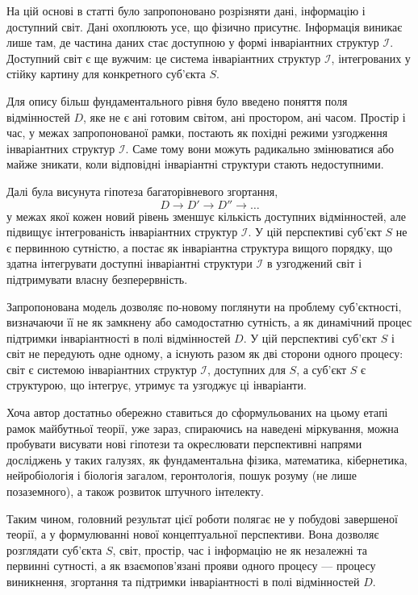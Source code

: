 \documentclass[aps,prd,onecolumn,nofootinbib,superscriptaddress]{revtex4-2}
\begin{document}
На цій основі в статті було запропоновано розрізняти дані, інформацію і доступний світ. Дані охоплюють усе, що фізично присутнє. Інформація виникає лише там, де частина даних стає доступною у формі інваріантних структур \(\mathcal{I}\). Доступний світ є ще вужчим: це система інваріантних структур \(\mathcal{I}\), інтегрованих у стійку картину для конкретного суб’єкта \(S\).

Для опису більш фундаментального рівня було введено поняття поля відмінностей \(D\), яке не є ані готовим світом, ані простором, ані часом. Простір і час, у межах запропонованої рамки, постають як похідні режими узгодження інваріантних структур \(\mathcal{I}\). Саме тому вони можуть радикально змінюватися або майже зникати, коли відповідні інваріантні структури стають недоступними.

Далі була висунута гіпотеза багаторівневого згортання,
\[
D \to D' \to D'' \to \dots
\]
у межах якої кожен новий рівень зменшує кількість доступних відмінностей, але підвищує інтегрованість інваріантних структур \(\mathcal{I}\). У цій перспективі суб’єкт \(S\) не є первинною сутністю, а постає як інваріантна структура вищого порядку, що здатна інтегрувати доступні інваріантні структури \(\mathcal{I}\) в узгоджений світ і підтримувати власну безперервність.

Запропонована модель дозволяє по-новому поглянути на проблему суб’єктності, визначаючи її не як замкнену або самодостатню сутність, а як динамічний процес підтримки інваріантності в полі відмінностей \(D\). У цій перспективі суб’єкт \(S\) і світ не передують одне одному, а існують разом як дві сторони одного процесу: світ є системою інваріантних структур \(\mathcal{I}\), доступних для \(S\), а суб’єкт \(S\) є структурою, що інтегрує, утримує та узгоджує ці інваріанти.

Хоча автор достатньо обережно ставиться до сформульованих на цьому етапі рамок майбутньої теорії, уже зараз, спираючись на наведені міркування, можна пробувати висувати нові гіпотези та окреслювати перспективні напрями досліджень у таких галузях, як фундаментальна фізика, математика, кібернетика, нейробіологія і біологія загалом, геронтологія, пошук розуму (не лише позаземного), а також розвиток штучного інтелекту.

Таким чином, головний результат цієї роботи полягає не у побудові завершеної теорії, а у формулюванні нової концептуальної перспективи. Вона дозволяє розглядати суб’єкта \(S\), світ, простір, час і інформацію не як незалежні та первинні сутності, а як взаємопов’язані прояви одного процесу — процесу виникнення, згортання та підтримки інваріантності в полі відмінностей \(D\).
\end{document}
